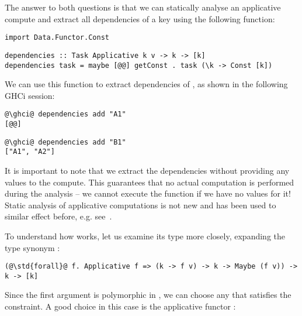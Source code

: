 The answer to both questions is that we can statically analyse an applicative
compute and extract all dependencies of a key using the following function:

\vspace{1mm}
\begin{verbatim}
import Data.Functor.Const
\end{verbatim}
\vspace{0.5mm}
\begin{verbatim}
dependencies :: Task Applicative k v -> k -> [k]
dependencies task = maybe [@@] getConst . task (\k -> Const [k])
\end{verbatim}
\vspace{1mm}

\noindent
We can use this function to extract dependencies of , as shown in the
following GHCi session:

\vspace{1mm}
\begin{verbatim}
@\ghci@ dependencies add "A1"
[@@]
\end{verbatim}
\begin{verbatim}
@\ghci@ dependencies add "B1"
["A1", "A2"]
\end{verbatim}
\vspace{1mm}

\noindent
It is important to note that we extract the dependencies without providing any
values to the compute. This guarantees that no actual computation is performed
during the analysis -- we cannot execute the function \hs{(+)} if we have no
values for it! Static analysis of applicative computations is not new and has
been used to similar effect before, e.g. see~\cite{free-applicatives}.

To understand how  works, let us examine its type more closely,
expanding the type synonym :

\vspace{1mm}
\begin{verbatim}
(@\std{forall}@ f. Applicative f => (k -> f v) -> k -> Maybe (f v)) -> k -> [k]
\end{verbatim}
\vspace{1mm}

\noindent
Since the first argument is polymorphic in , we can choose any  that
satisfies the  constraint. A good choice in this case is the
applicative functor :

